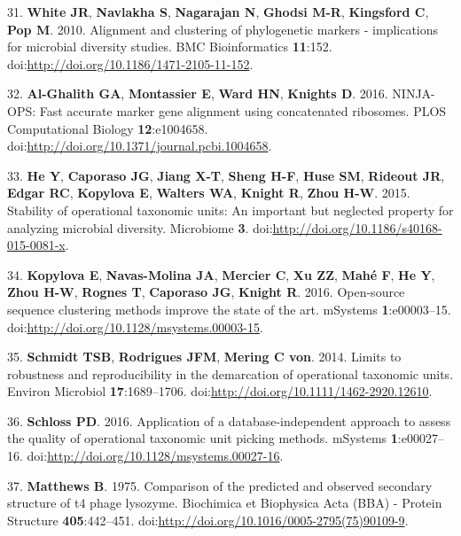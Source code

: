 \documentclass[11pt,]{article}
\begin{document}
31. \textbf{White JR}, \textbf{Navlakha S}, \textbf{Nagarajan N},
\textbf{Ghodsi M-R}, \textbf{Kingsford C}, \textbf{Pop M}. 2010.
Alignment and clustering of phylogenetic markers - implications for
microbial diversity studies. BMC Bioinformatics \textbf{11}:152.
doi:\url{http://doi.org/10.1186/1471-2105-11-152}.

32. \textbf{Al-Ghalith GA}, \textbf{Montassier E}, \textbf{Ward HN},
\textbf{Knights D}. 2016. NINJA-OPS: Fast accurate marker gene alignment
using concatenated ribosomes. PLOS Computational Biology
\textbf{12}:e1004658.
doi:\url{http://doi.org/10.1371/journal.pcbi.1004658}.

33. \textbf{He Y}, \textbf{Caporaso JG}, \textbf{Jiang X-T},
\textbf{Sheng H-F}, \textbf{Huse SM}, \textbf{Rideout JR}, \textbf{Edgar
RC}, \textbf{Kopylova E}, \textbf{Walters WA}, \textbf{Knight R},
\textbf{Zhou H-W}. 2015. Stability of operational taxonomic units: An
important but neglected property for analyzing microbial diversity.
Microbiome \textbf{3}.
doi:\url{http://doi.org/10.1186/s40168-015-0081-x}.

34. \textbf{Kopylova E}, \textbf{Navas-Molina JA}, \textbf{Mercier C},
\textbf{Xu ZZ}, \textbf{Mahé F}, \textbf{He Y}, \textbf{Zhou H-W},
\textbf{Rognes T}, \textbf{Caporaso JG}, \textbf{Knight R}. 2016.
Open-source sequence clustering methods improve the state of the art.
mSystems \textbf{1}:e00003--15.
doi:\url{http://doi.org/10.1128/msystems.00003-15}.

35. \textbf{Schmidt TSB}, \textbf{Rodrigues JFM}, \textbf{Mering C von}.
2014. Limits to robustness and reproducibility in the demarcation of
operational taxonomic units. Environ Microbiol \textbf{17}:1689--1706.
doi:\url{http://doi.org/10.1111/1462-2920.12610}.

36. \textbf{Schloss PD}. 2016. Application of a database-independent
approach to assess the quality of operational taxonomic unit picking
methods. mSystems \textbf{1}:e00027--16.
doi:\url{http://doi.org/10.1128/msystems.00027-16}.

37. \textbf{Matthews B}. 1975. Comparison of the predicted and observed
secondary structure of t4 phage lysozyme. Biochimica et Biophysica Acta
(BBA) - Protein Structure \textbf{405}:442--451.
doi:\url{http://doi.org/10.1016/0005-2795(75)90109-9}.
\end{document}
